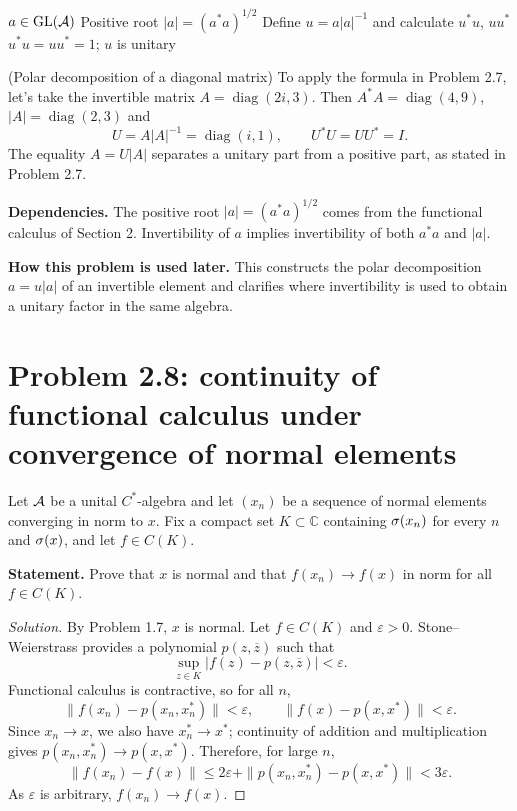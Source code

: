 \proofdiagram
{$a\in\operatorname{GL}(\mathcal A)$}
{Positive root $|a|=(a^*a)^{1/2}$}
{Define $u=a|a|^{-1}$ and calculate $u^*u$, $uu^*$}
{$u^*u=uu^*=1$; $u$ is unitary}

\begin{cthejemplo}{(Polar decomposition of a diagonal matrix)}
To apply the formula in Problem 2.7, let's take the invertible matrix
$A=\operatorname{diag}(2i,3)$.
Then $A^*A=\operatorname{diag}(4,9)$,
$|A|=\operatorname{diag}(2,3)$ and
\[
 U=A|A|^{-1}=\operatorname{diag}(i,1),\qquad U^*U=UU^*=I.
\]
The equality $A=U|A|$ separates a unitary part from a positive part, as stated in Problem 2.7.
\end{cthejemplo}

\noindent\textbf{Dependencies.} The positive root $|a|=(a^*a)^{1/2}$ comes from the functional calculus of Section 2. Invertibility of $a$ implies invertibility of both $a^*a$ and $|a|$.

\noindent\textbf{How this problem is used later.} This constructs the polar decomposition $a=u|a|$ of an invertible element and clarifies where invertibility is used to obtain a unitary factor in the same algebra.

\section{Problem 2.8: continuity of functional calculus under convergence of normal elements}

Let $\mathcal A$ be a unital $C^*$-algebra and let $(x_n)$ be a sequence of normal elements
converging in norm to $x$. Fix a compact set $K\subset\mathbb C$ containing $\sigma(x_n)$
for every $n$ and $\sigma(x)$, and let $f\in C(K)$.

\noindent\textbf{Statement.} Prove that $x$ is normal and that $f(x_n)\to f(x)$ in norm for all $f\in C(K)$.

\begin{proof}[Solution]
By Problem 1.7, $x$ is normal. Let $f\in C(K)$ and $\varepsilon>0$. Stone--Weierstrass provides
a polynomial $p(z,\overline z)$ such that
\[
 \sup_{z\in K}|f(z)-p(z,\overline z)|<\varepsilon.
\]
Functional calculus is contractive, so for all $n$,
\[
\|f(x_n)-p(x_n,x_n^*)\|<\varepsilon,
\qquad
\|f(x)-p(x,x^*)\|<\varepsilon.
\]
Since $x_n\to x$, we also have $x_n^*\to x^*$; continuity of addition and multiplication gives
$p(x_n,x_n^*)\to p(x,x^*)$. Therefore, for large $n$,
\[
\|f(x_n)-f(x)\|
\le 2\varepsilon+\|p(x_n,x_n^*)-p(x,x^*)\|<3\varepsilon.
\]
As $\varepsilon$ is arbitrary, $f(x_n)\to f(x)$.
\end{proof}


